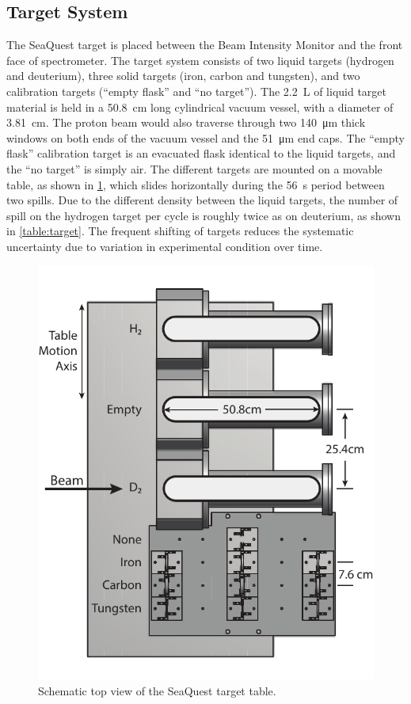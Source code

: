 \documentclass[reprint,aps,unsortedaddress,superscriptaddress,prc,floatfix,showpacs,linenumbers,final]{revtex4-2}
\begin{document}
\subsection{Target System}
The SeaQuest target is placed between the Beam Intensity Monitor and the front face
of spectrometer. The target system consists of two liquid targets (hydrogen and deuterium),
three solid targets (iron, carbon and tungsten), and two calibration targets (``empty flask'' and ``no target'').
The \SI{2.2}{\liter} of liquid target material is held
in a \SI{50.8}{\cm} long cylindrical vacuum vessel, with a diameter of \SI{3.81}{\cm}.
The proton beam would also traverse through two
\SI{140}{\um} thick windows on both ends of the vacuum vessel and the \SI{51}{\um} end caps.
The ``empty flask'' calibration target is an evacuated flask identical to the liquid targets,
and the ``no target'' is simply air.
The different targets are mounted on a movable table, as shown in \cref{fig:target_table},
which slides horizontally during the \SI{56}{\s} period between two spills.
Due to the different density between the liquid targets, the number of spill on the
hydrogen target per cycle is roughly twice as on deuterium, as shown in \cref{table:target}.
The frequent shifting of targets reduces the systematic uncertainty due to variation in experimental condition over time. 
\begin{figure}[htb]
	\centering
	\includegraphics[width=\linewidth]{spectrometer/target-tableLayout.pdf}
	\caption{Schematic top view of the SeaQuest target table.}
	\label{fig:target_table}
\end{figure}
\end{document}
